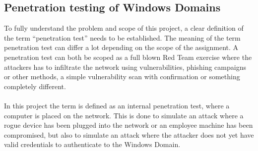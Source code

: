 \documentclass{article}
\begin{document}
\subsection{Penetration testing of Windows Domains}
To fully understand the problem and scope of this project, a clear definition of the term \enquote{penetration test} needs to be established. The meaning of the term penetration test can differ a lot depending on the scope of the assignment. A penetration test can both be scoped as a full blown Red Team exercise where the attackers has to infiltrate the network using vulnerabilities, phishing campaigns or other methods, a simple vulnerability scan with confirmation or something completely different.
\\\\
In this project the term is defined as an internal penetration test, where a computer is placed on the network. This is done to simulate an attack where a rogue device has been plugged into the network or an employee machine has been compromised, but also to simulate an attack where the attacker does not yet have valid credentials to authenticate to the Windows Domain.
\end{document}
